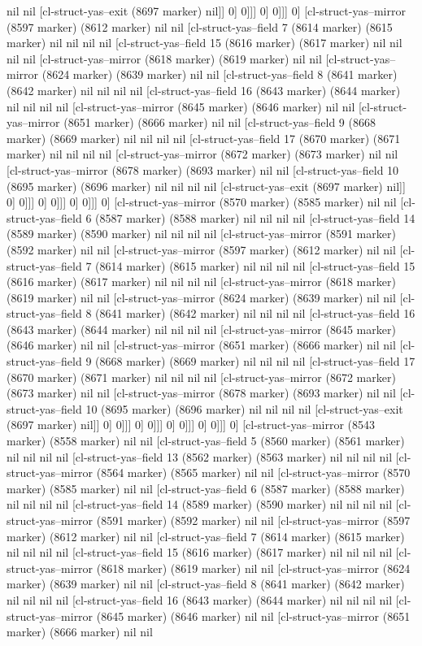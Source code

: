 {{nil nil [cl-struct-yas--exit (8697 marker) nil]] 0] 0]]] 0] 0]]] 0] [cl-struct-yas--mirror (8597 marker) (8612 marker) nil nil [cl-struct-yas--field 7 (8614 marker) (8615 marker) nil nil nil nil [cl-struct-yas--field 15 (8616 marker) (8617 marker) nil nil nil nil [cl-struct-yas--mirror (8618 marker) (8619 marker) nil nil [cl-struct-yas--mirror (8624 marker) (8639 marker) nil nil [cl-struct-yas--field 8 (8641 marker) (8642 marker) nil nil nil nil [cl-struct-yas--field 16 (8643 marker) (8644 marker) nil nil nil nil [cl-struct-yas--mirror (8645 marker) (8646 marker) nil nil [cl-struct-yas--mirror (8651 marker) (8666 marker) nil nil [cl-struct-yas--field 9 (8668 marker) (8669 marker) nil nil nil nil [cl-struct-yas--field 17 (8670 marker) (8671 marker) nil nil nil nil [cl-struct-yas--mirror (8672 marker) (8673 marker) nil nil [cl-struct-yas--mirror (8678 marker) (8693 marker) nil nil [cl-struct-yas--field 10 (8695 marker) (8696 marker) nil nil nil nil [cl-struct-yas--exit (8697 marker) nil]] 0] 0]]] 0] 0]]] 0] 0]]] 0] [cl-struct-yas--mirror (8570 marker) (8585 marker) nil nil [cl-struct-yas--field 6 (8587 marker) (8588 marker) nil nil nil nil [cl-struct-yas--field 14 (8589 marker) (8590 marker) nil nil nil nil [cl-struct-yas--mirror (8591 marker) (8592 marker) nil nil [cl-struct-yas--mirror (8597 marker) (8612 marker) nil nil [cl-struct-yas--field 7 (8614 marker) (8615 marker) nil nil nil nil [cl-struct-yas--field 15 (8616 marker) (8617 marker) nil nil nil nil [cl-struct-yas--mirror (8618 marker) (8619 marker) nil nil [cl-struct-yas--mirror (8624 marker) (8639 marker) nil nil [cl-struct-yas--field 8 (8641 marker) (8642 marker) nil nil nil nil [cl-struct-yas--field 16 (8643 marker) (8644 marker) nil nil nil nil [cl-struct-yas--mirror (8645 marker) (8646 marker) nil nil [cl-struct-yas--mirror (8651 marker) (8666 marker) nil nil [cl-struct-yas--field 9 (8668 marker) (8669 marker) nil nil nil nil [cl-struct-yas--field 17 (8670 marker) (8671 marker) nil nil nil nil [cl-struct-yas--mirror (8672 marker) (8673 marker) nil nil [cl-struct-yas--mirror (8678 marker) (8693 marker) nil nil [cl-struct-yas--field 10 (8695 marker) (8696 marker) nil nil nil nil [cl-struct-yas--exit (8697 marker) nil]] 0] 0]]] 0] 0]]] 0] 0]]] 0] 0]]] 0] [cl-struct-yas--mirror (8543 marker) (8558 marker) nil nil [cl-struct-yas--field 5 (8560 marker) (8561 marker) nil nil nil nil [cl-struct-yas--field 13 (8562 marker) (8563 marker) nil nil nil nil [cl-struct-yas--mirror (8564 marker) (8565 marker) nil nil [cl-struct-yas--mirror (8570 marker) (8585 marker) nil nil [cl-struct-yas--field 6 (8587 marker) (8588 marker) nil nil nil nil [cl-struct-yas--field 14 (8589 marker) (8590 marker) nil nil nil nil [cl-struct-yas--mirror (8591 marker) (8592 marker) nil nil [cl-struct-yas--mirror (8597 marker) (8612 marker) nil nil [cl-struct-yas--field 7 (8614 marker) (8615 marker) nil nil nil nil [cl-struct-yas--field 15 (8616 marker) (8617 marker) nil nil nil nil [cl-struct-yas--mirror (8618 marker) (8619 marker) nil nil [cl-struct-yas--mirror (8624 marker) (8639 marker) nil nil [cl-struct-yas--field 8 (8641 marker) (8642 marker) nil nil nil nil [cl-struct-yas--field 16 (8643 marker) (8644 marker) nil nil nil nil [cl-struct-yas--mirror (8645 marker) (8646 marker) nil nil [cl-struct-yas--mirror (8651 marker) (8666 marker) nil nil }}
